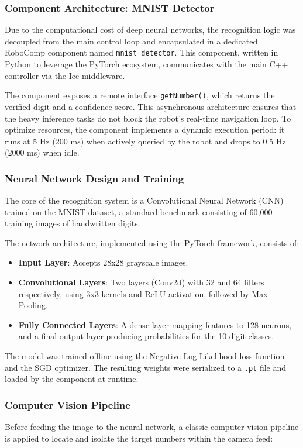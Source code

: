 \documentclass[conference]{IEEEtran}
\begin{document}
    \subsubsection{\textbf{Component Architecture: MNIST Detector}}
    Due to the computational cost of deep neural networks, the recognition logic was decoupled from the main control loop and encapsulated in a dedicated RoboComp component named \texttt{mnist\_detector}. This component, written in Python to leverage the PyTorch ecosystem, communicates with the main C++ controller via the Ice middleware.

    The component exposes a remote interface \texttt{getNumber()}, which returns the verified digit and a confidence score. This asynchronous architecture ensures that the heavy inference tasks do not block the robot's real-time navigation loop. To optimize resources, the component implements a dynamic execution period: it runs at 5 Hz (200 ms) when actively queried by the robot and drops to 0.5 Hz (2000 ms) when idle.

    \subsubsection{\textbf{Neural Network Design and Training}}
    The core of the recognition system is a Convolutional Neural Network (CNN) trained on the MNIST dataset, a standard benchmark consisting of 60,000 training images of handwritten digits.

    The network architecture, implemented using the PyTorch framework, consists of:
    \begin{itemize}
        \item \textbf{Input Layer}: Accepts 28x28 grayscale images.
        \item \textbf{Convolutional Layers}: Two layers (Conv2d) with 32 and 64 filters respectively, using 3x3 kernels and ReLU activation, followed by Max Pooling.
        \item \textbf{Fully Connected Layers}: A dense layer mapping features to 128 neurons, and a final output layer producing probabilities for the 10 digit classes.
    \end{itemize}

    The model was trained offline using the Negative Log Likelihood loss function and the SGD optimizer. The resulting weights were serialized to a \texttt{.pt} file and loaded by the component at runtime.

    \subsubsection{\textbf{Computer Vision Pipeline}}
    Before feeding the image to the neural network, a classic computer vision pipeline is applied to locate and isolate the target numbers within the camera feed:
\end{document}
